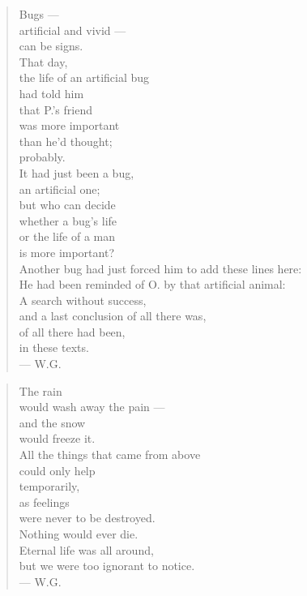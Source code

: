 \begin{verse}
Bugs --- \\
artificial and vivid --- \\
can be signs. \\
That day, \\
the life of an artificial bug \\
had told him \\
that P.'s friend \\
was more important \\
than he'd thought; \\
probably. \\
It had just been a bug, \\
an artificial one; \\
but who can decide \\
whether a bug's life \\
or the life of a man \\
is more important? \\
Another bug had just forced him to add these lines here: \\
He had been reminded of O. by that artificial animal: \\
A search without success, \\
and a last conclusion of all there was, \\
of all there had been, \\
in these texts. \\
--- W.G.
\end{verse}

\begin{verse}
The rain \\
would wash away the pain --- \\
and the snow \\
would freeze it. \\
All the things that came from above \\
could only help \\
temporarily, \\
as feelings \\
were never to be destroyed. \\
Nothing would ever die. \\
Eternal life was all around, \\
but we were too ignorant to notice. \\
--- W.G.
\end{verse}

